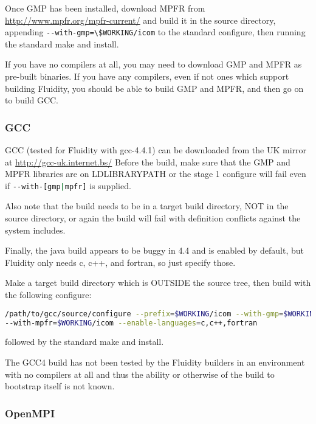 Once GMP has been installed, download MPFR from
\url{http://www.mpfr.org/mpfr-current/} and build it in the source directory,
appending \lstinline[language=bash]+--with-gmp=\$WORKING/icom+ to the standard
configure, then running the standard make and install.

If you have no compilers at all, you may need to download GMP and MPFR as
pre-built binaries. If you have any compilers, even if not ones which support
building Fluidity, you should be able to build GMP and MPFR, and then go on to
build GCC.

\subsubsection{GCC}
\label{sect:required_libraries_compilers_gcc}

GCC (tested for Fluidity with gcc-4.4.1) can be downloaded from the UK mirror
at \url{http://gcc-uk.internet.bs/} Before the build, make sure that the GMP
and MPFR libraries are on LD{\textunderscore}LIBRARY{\textunderscore}PATH or
the stage 1 configure will fail even if
\lstinline[language=bash]+--with-[gmp|mpfr]+ is supplied.

Also note that the build needs to be in a target build directory, NOT in the
source directory, or again the build will fail with definition conflicts
against the system includes.

Finally, the java build appears to be buggy in 4.4 and is enabled by default,
but Fluidity only needs c, c++, and fortran, so just specify those.

Make a target build directory which is OUTSIDE the source tree, then build
with the following configure:

\begin{lstlisting}[language=bash]
/path/to/gcc/source/configure --prefix=$WORKING/icom --with-gmp=$WORKING/icom
--with-mpfr=$WORKING/icom --enable-languages=c,c++,fortran
\end{lstlisting}

followed by the standard make and install.

The GCC4 build has not been tested by the Fluidity builders in an environment
with no compilers at all and thus the ability or otherwise of the build to
bootstrap itself is not known.

\subsubsection{OpenMPI}
\label{sect:required_libraries_compilers_openmpi}

